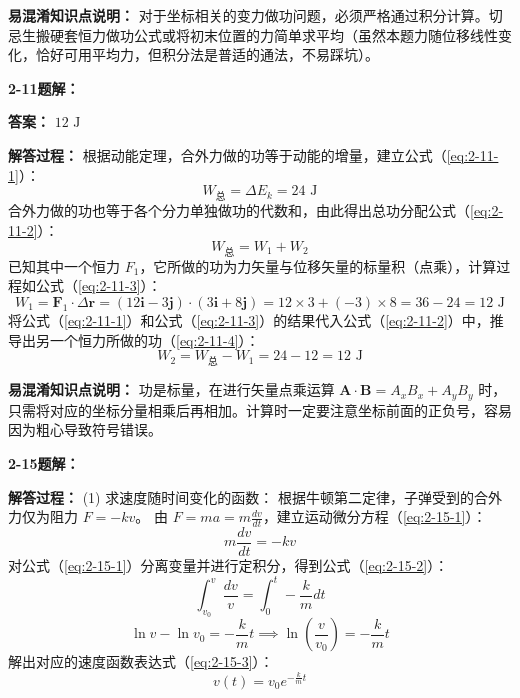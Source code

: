 \textbf{易混淆知识点说明：}
对于坐标相关的变力做功问题，必须严格通过积分计算。切忌生搬硬套恒力做功公式或将初末位置的力简单求平均（虽然本题力随位移线性变化，恰好可用平均力，但积分法是普适的通法，不易踩坑）。

\vspace{2em}

\textbf{2-11题解：}
\setcounter{equation}{0}
\renewcommand{\theHequation}{2-11.\arabic{equation}}

\textbf{答案：} $12\text{ J}$

\textbf{解答过程：}
根据动能定理，合外力做的功等于动能的增量，建立公式（\ref{eq:2-11-1}）：
\begin{equation}\label{eq:2-11-1}
	W_{\text{总}} = \Delta E_k = 24\text{ J}
\end{equation}
合外力做的功也等于各个分力单独做功的代数和，由此得出总功分配公式（\ref{eq:2-11-2}）：
\begin{equation}\label{eq:2-11-2}
	W_{\text{总}} = W_1 + W_2
\end{equation}
已知其中一个恒力 $F_1$，它所做的功为力矢量与位移矢量的标量积（点乘），计算过程如公式（\ref{eq:2-11-3}）：
\begin{equation}\label{eq:2-11-3}
	W_1 = \mathbf{F}_1 \cdot \Delta\mathbf{r} = (12\mathbf{i} - 3\mathbf{j}) \cdot (3\mathbf{i} + 8\mathbf{j}) = 12 \times 3 + (-3) \times 8 = 36 - 24 = 12\text{ J}
\end{equation}
将公式（\ref{eq:2-11-1}）和公式（\ref{eq:2-11-3}）的结果代入公式（\ref{eq:2-11-2}）中，推导出另一个恒力所做的功（\ref{eq:2-11-4}）：
\begin{equation}\label{eq:2-11-4}
	W_2 = W_{\text{总}} - W_1 = 24 - 12 = 12\text{ J}
\end{equation}

\textbf{易混淆知识点说明：}
功是标量，在进行矢量点乘运算 $\mathbf{A} \cdot \mathbf{B} = A_x B_x + A_y B_y$ 时，只需将对应的坐标分量相乘后再相加。计算时一定要注意坐标前面的正负号，容易因为粗心导致符号错误。

\vspace{2em}

\textbf{2-15题解：}
\setcounter{equation}{0}
\renewcommand{\theHequation}{2-15.\arabic{equation}}

\textbf{解答过程：}
(1) 求速度随时间变化的函数：
根据牛顿第二定律，子弹受到的合外力仅为阻力 $F = -kv$。
由 $F = ma = m\frac{dv}{dt}$，建立运动微分方程（\ref{eq:2-15-1}）：
\begin{equation}\label{eq:2-15-1}
	m\frac{dv}{dt} = -kv
\end{equation}
对公式（\ref{eq:2-15-1}）分离变量并进行定积分，得到公式（\ref{eq:2-15-2}）：
\begin{equation}\label{eq:2-15-2}
	\int_{v_0}^{v} \frac{dv}{v} = \int_{0}^{t} -\frac{k}{m} dt
\end{equation}
$$\ln v - \ln v_0 = -\frac{k}{m}t \implies \ln\left(\frac{v}{v_0}\right) = -\frac{k}{m}t$$
解出对应的速度函数表达式（\ref{eq:2-15-3}）：
\begin{equation}\label{eq:2-15-3}
	v(t) = v_0 e^{-\frac{k}{m}t}
\end{equation}

